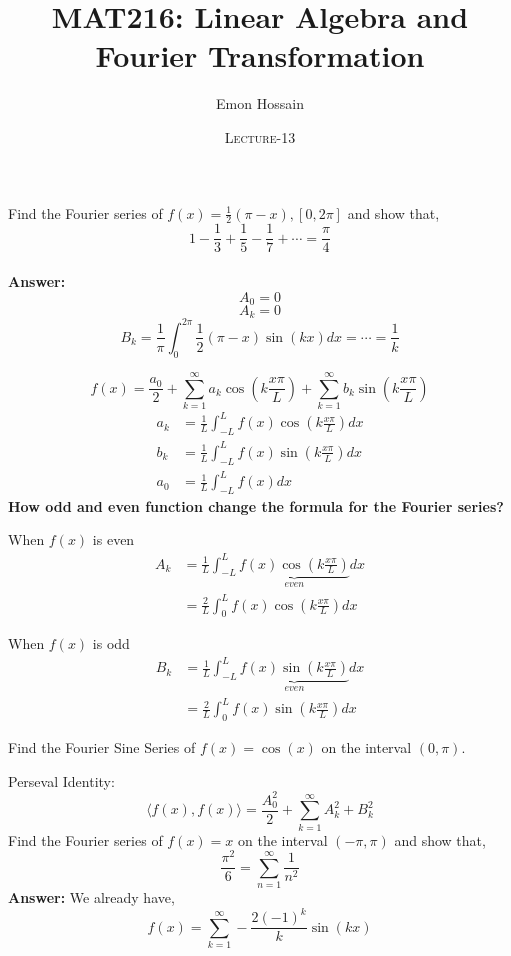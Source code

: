 \documentclass[11pt]{beamer}
\author[] %
{Emon Hossain\inst{1}}
\institute[University of Dhaka] %
{
  \inst{1}%
  Lecturer\\MNS department\\Brac University
}
\date[] %
{\textsc{Lecture-13}}
\title[]{MAT216: Linear Algebra and Fourier Transformation}
\theoremstyle{plain}
\begin{document}
\begin{frame}
\titlepage
\end{frame}


\begin{frame}
    Find the Fourier series of $f(x)=\frac12(\pi-x), [0,2\pi]$ and show that, $$1-\frac13+\frac15-\frac17+\cdots=\frac{\pi}{4}$$\\
    \textbf{Answer:}
    $$A_0=0$$
    $$A_k=0$$
    $$B_k=\frac{1}{\pi}\int_0^{2\pi} \frac12(\pi-x)\sin(kx)dx=\cdots=\frac1k$$
\end{frame}

\begin{frame}
    $$
f(x)=\frac{a_0}{2}+\sum_{k=1}^\infty a_k \cos\left(k\frac{x\pi}{L}\right)+\sum_{k=1}^\infty b_k\sin\left(k\frac{x\pi}{L}\right)
$$
    \begin{align*}
        a_k &= \frac{1}{L} \int_{-L}^L f(x)\cos(k\frac{x\pi}{L}) dx\\
        b_k &= \frac{1}{L} \int_{-L}^L f(x)\sin(k\frac{x\pi}{L}) dx\\
        a_0 &= \frac{1}{L} \int_{-L}^L f(x) dx
    \end{align*}
    \textbf{How odd and even function change the formula for the Fourier series?}
\end{frame}

\begin{frame}{When $f(x)$ is even}
\begin{align*}
    A_k&=\frac{1}{L} \int_{-L}^L \underbrace{f(x)\cos\left(k\frac{x\pi}{L}\right)}_{even} dx\\
    &= \frac{2}{L} \int_0^L f(x)\cos\left(k\frac{x\pi}{L}\right) dx
\end{align*}    
\end{frame}

\begin{frame}{When $f(x)$ is odd}
\begin{align*}
    B_k&=\frac{1}{L} \int_{-L}^L \underbrace{f(x)\sin\left(k\frac{x\pi}{L}\right)}_{even} dx\\
    &= \frac{2}{L} \int_0^L f(x)\sin\left(k\frac{x\pi}{L}\right) dx
\end{align*}    
\end{frame}

\begin{frame}
    Find the Fourier Sine Series of $f(x)=\cos(x)$ on the interval $(0,\pi)$. 
\end{frame}

\begin{frame}
    Perseval Identity: $$\langle f(x),f(x) \rangle=\frac{A_0^2}{2}+\sum_{k=1}^\infty A_k^2+B_k^2$$
    Find the Fourier series of $f(x)=x$ on the interval $(-\pi,\pi)$ and show that, $$\frac{\pi^2}{6}=\sum_{n=1}^\infty \frac{1}{n^2}$$
    \textbf{Answer:} We already have, $$f(x)=\sum_{k=1}^\infty -\frac{2(-1)^k}{k}\sin (kx)$$
\end{frame}
\end{document}
